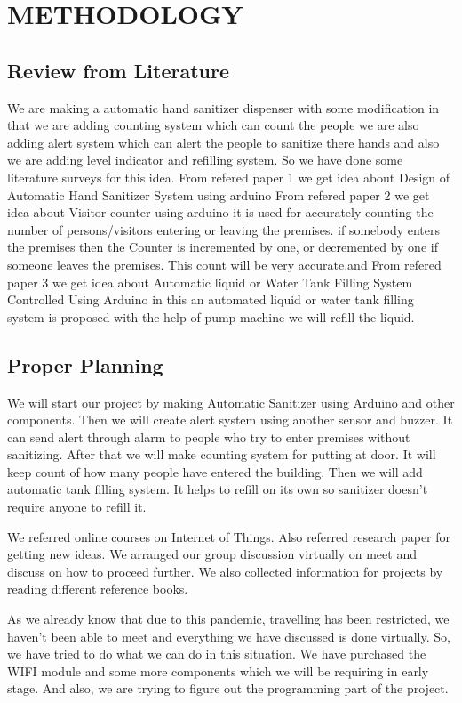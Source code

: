 
\chapter{METHODOLOGY} 

\section{Review from Literature}

We are making a automatic hand sanitizer dispenser with some modification in that we are adding counting system which can count the people we are also adding alert system which can alert the people to sanitize there hands and also we are adding level indicator and refilling system. So we have done some literature surveys for this idea. From refered paper 1 we get idea about Design of Automatic Hand Sanitizer System using arduino From refered paper 2 we get idea about Visitor counter using arduino it is used for accurately counting the number of persons/visitors entering or leaving the premises. if somebody enters the premises then the Counter is incremented by one, or decremented by one if someone leaves the premises. This count will be very accurate.and From refered paper 3 we get idea about Automatic liquid or Water Tank Filling System Controlled Using Arduino in this an automated liquid or water tank filling system is proposed with the help of pump machine we will refill the liquid.

\newpage

\section{Proper Planning}

      We will start our project by making Automatic Sanitizer using Arduino and other components. Then we will create alert system using another sensor and buzzer. It can send alert through alarm to people who try to enter premises without sanitizing. After that we will make counting system for putting at door. It will keep count of how many people have entered the building. Then we will add automatic tank filling system. It helps to refill on its own so sanitizer doesn't require anyone to refill it.

   We referred online courses on Internet of Things. Also referred research paper for getting new ideas. We arranged our group discussion virtually on meet and discuss on how to proceed further. We also collected information for projects by reading different reference books.\par
   As we already know that due to this pandemic, travelling has been restricted, we haven't been able to meet and everything we have discussed is done virtually. So, we have tried to do what we can do in this situation. We have purchased the WIFI module and some more components which we will be requiring in early stage. And also, we are trying to figure out the programming part of the project.

\newpage



 


